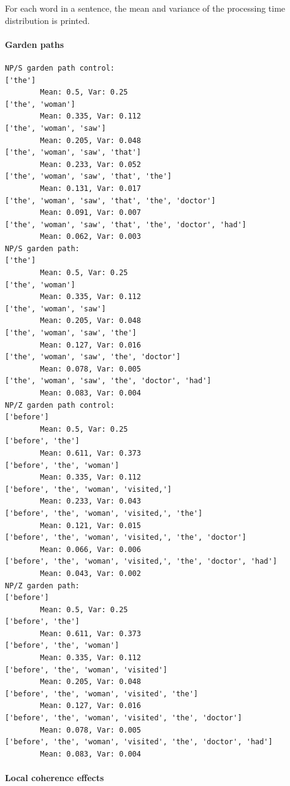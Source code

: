 \documentclass[a4paper, 12pt]{article}
\begin{document}
For each word in a sentence, the mean and variance of the processing time
distribution is printed.




\paragraph{Garden paths}

\begin{verbatim}
NP/S garden path control:
['the']
        Mean: 0.5, Var: 0.25
['the', 'woman']
        Mean: 0.335, Var: 0.112
['the', 'woman', 'saw']
        Mean: 0.205, Var: 0.048
['the', 'woman', 'saw', 'that']
        Mean: 0.233, Var: 0.052
['the', 'woman', 'saw', 'that', 'the']
        Mean: 0.131, Var: 0.017
['the', 'woman', 'saw', 'that', 'the', 'doctor']
        Mean: 0.091, Var: 0.007
['the', 'woman', 'saw', 'that', 'the', 'doctor', 'had']
        Mean: 0.062, Var: 0.003
NP/S garden path:
['the']
        Mean: 0.5, Var: 0.25
['the', 'woman']
        Mean: 0.335, Var: 0.112
['the', 'woman', 'saw']
        Mean: 0.205, Var: 0.048
['the', 'woman', 'saw', 'the']
        Mean: 0.127, Var: 0.016
['the', 'woman', 'saw', 'the', 'doctor']
        Mean: 0.078, Var: 0.005
['the', 'woman', 'saw', 'the', 'doctor', 'had']
        Mean: 0.083, Var: 0.004
NP/Z garden path control:
['before']
        Mean: 0.5, Var: 0.25
['before', 'the']
        Mean: 0.611, Var: 0.373
['before', 'the', 'woman']
        Mean: 0.335, Var: 0.112
['before', 'the', 'woman', 'visited,']
        Mean: 0.233, Var: 0.043
['before', 'the', 'woman', 'visited,', 'the']
        Mean: 0.121, Var: 0.015
['before', 'the', 'woman', 'visited,', 'the', 'doctor']
        Mean: 0.066, Var: 0.006
['before', 'the', 'woman', 'visited,', 'the', 'doctor', 'had']
        Mean: 0.043, Var: 0.002
NP/Z garden path:
['before']
        Mean: 0.5, Var: 0.25
['before', 'the']
        Mean: 0.611, Var: 0.373
['before', 'the', 'woman']
        Mean: 0.335, Var: 0.112
['before', 'the', 'woman', 'visited']
        Mean: 0.205, Var: 0.048
['before', 'the', 'woman', 'visited', 'the']
        Mean: 0.127, Var: 0.016
['before', 'the', 'woman', 'visited', 'the', 'doctor']
        Mean: 0.078, Var: 0.005
['before', 'the', 'woman', 'visited', 'the', 'doctor', 'had']
        Mean: 0.083, Var: 0.004
\end{verbatim}


\paragraph{Local coherence effects}
\end{document}
